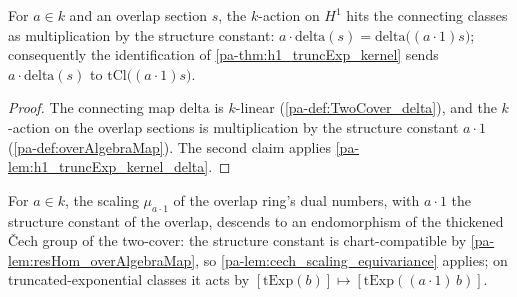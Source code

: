 \begin{lemma}
  \label{pa-lem:smul_delta}
  \leanok

  For \(a \in k\) and an overlap section \(s\), the \(k\)-action on \(H^1\) hits the
  connecting classes as multiplication by the structure constant:
  \(a \cdot \mathrm{delta}(s) = \mathrm{delta}\bigl((a \cdot 1) s\bigr)\); consequently
  the identification of \ref{pa-thm:h1_truncExp_kernel} sends
  \(a \cdot \mathrm{delta}(s)\) to \(\mathrm{tCl}\bigl((a \cdot 1) s\bigr)\).
\end{lemma}
\begin{proof}
  \leanok
  The connecting map \(\mathrm{delta}\) is \(k\)-linear
  (\ref{pa-def:TwoCover_delta}), and the \(k\)-action on the overlap sections is
  multiplication by the structure constant \(a \cdot 1\)
  (\ref{pa-def:overAlgebraMap}). The second claim applies
  \ref{pa-lem:h1_truncExp_kernel_delta}.
\end{proof}

\begin{definition}
  \label{pa-def:twoCover_mumfordScaling}
  \leanok

  For \(a \in k\), the scaling \(\mu_{a \cdot 1}\) of the overlap ring's dual numbers,
  with \(a \cdot 1\) the structure constant of the overlap, descends to an endomorphism
  of the thickened \v{C}ech group of the two-cover: the structure constant is
  chart-compatible by \ref{pa-lem:resHom_overAlgebraMap}, so
  \ref{pa-lem:cech_scaling_equivariance} applies; on truncated-exponential classes it acts
  by \([\mathrm{tExp}(b)] \mapsto [\mathrm{tExp}((a \cdot 1)\, b)]\).
\end{definition}


